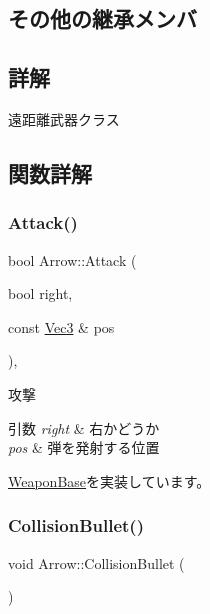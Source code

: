 \subsection*{その他の継承メンバ}


\subsection{詳解}
遠距離武器クラス 

\subsection{関数詳解}
\mbox{\label{class_arrow_a98ea469bf0b21635b2d2dadb69c72240}} 
\subsubsection{\texorpdfstring{Attack()}{Attack()}}
{\footnotesize\ttfamily bool Arrow\+::\+Attack (\begin{DoxyParamCaption}\item[{bool}]{right,  }\item[{const \mbox{\hyperlink{common_8h_ab1cb35b3a17c398d8ef71d5f779808bf}{Vec3}} \&}]{pos }\end{DoxyParamCaption})\hspace{0.3cm}{\ttfamily [final]}, {\ttfamily [virtual]}}



攻撃 


\begin{DoxyParams}{引数}
{\em right} & 右かどうか \\
\hline
{\em pos} & 弾を発射する位置 \\
\hline
\end{DoxyParams}


\mbox{\hyperlink{class_weapon_base_a1bab9c7fb9524db754bebbbcbf6c2fd9}{Weapon\+Base}}を実装しています。

\mbox{\label{class_arrow_afe567fd69597c0a5c44edd99c06d6f71}} 
\subsubsection{\texorpdfstring{Collision\+Bullet()}{CollisionBullet()}}
{\footnotesize\ttfamily void Arrow\+::\+Collision\+Bullet (\begin{DoxyParamCaption}{ }\end{DoxyParamCaption})}



